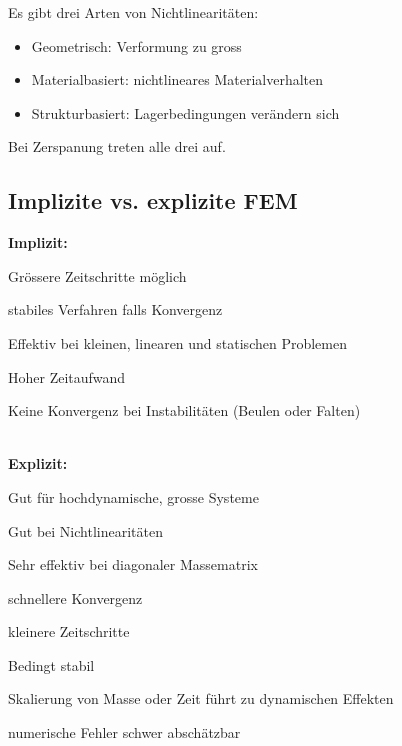 Es gibt drei Arten von Nichtlinearitäten:
\begin{itemize}
    \item Geometrisch: Verformung zu gross
    \item Materialbasiert: nichtlineares Materialverhalten
    \item Strukturbasiert: Lagerbedingungen verändern sich
\end{itemize}
Bei Zerspanung treten alle drei auf.

\subsection{Implizite vs. explizite FEM}

\textbf{Implizit:} \\
\begin{minipage}{0.45\linewidth}
    \begin{plusitemize}
        \item Grössere Zeitschritte möglich 
        \item stabiles Verfahren falls Konvergenz
        \item Effektiv bei kleinen, linearen und statischen Problemen
    \end{plusitemize}
\end{minipage}
\begin{minipage}{0.5\linewidth}
    \begin{minusitemize}
        \item Hoher Zeitaufwand 
        \item Keine Konvergenz bei Instabilitäten (Beulen oder Falten)
    \end{minusitemize}
\end{minipage}
\\

\textbf{Explizit:} \\
\begin{minipage}{0.45\linewidth}
    \begin{plusitemize}
        \item Gut für hochdynamische, grosse Systeme
        \item Gut bei Nichtlinearitäten
        \item Sehr effektiv bei diagonaler Massematrix 
        \item schnellere Konvergenz
    \end{plusitemize}
\end{minipage}
\begin{minipage}{0.5\linewidth}
    \begin{minusitemize}
        \item kleinere Zeitschritte
        \item Bedingt stabil
        \item Skalierung von Masse oder Zeit führt zu dynamischen Effekten
        \item numerische Fehler schwer abschätzbar
    \end{minusitemize}
\end{minipage}
